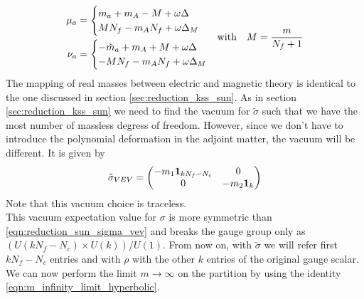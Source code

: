 \begin{equation}
\begin{aligned}
  \mu_a &  = \begin{cases}
  m_a + m_A - M + \omega \Delta \\
  M N_f - m_A N_f + \omega \Delta_M\\
  \end{cases}
  \\
 \nu_a & =   \begin{cases}
  - \tilde{m}_a + m_A + M + \omega \Delta \\
  - M N_f - m_A N_f + \omega \Delta_M \\
  \end{cases}
\end{aligned}
\\
\hbox{with} \quad M =  \frac{m}{N_f +1}
\end{equation}
The mapping of real masses between electric and magnetic theory is identical to the one discussed in section \ref{sec:reduction_kss_sun}.
As in section \ref{sec:reduction_kss_sun} we need to find the vacuum for $\tilde{\sigma}$ such that we have the most number of massless degress of freedom.
However, since we don't have to introduce the polynomial deformation in the adjoint matter, the vacuum will be different. It is given by
\begin{equation}
 \tilde{\sigma}_{VEV} =
 \begin{pmatrix}
  - m_1 \bold{ 1}_{ k N_f - N_c} & 0 \\
  0 &  - m_2 \bold{ 1}_{k}
 \end{pmatrix}
\end{equation}
Note that this vacuum choice is traceless.\\
This vacuum expectation value for $\sigma$ is more symmetric than \eqref{eqn:reduction_sun_sigma_vev} and breaks the gauge group only as $\left(U(k N_f - N_c) \times U(k) \right) / U(1)$.
From now on, with $\tilde{\sigma}$ we will refer first $k N_f - N_c$ entries and with $\rho$ with the other $k$ entries of the original gauge scalar.
\\
We can now perform the limit $m \rightarrow \infty$ on the partition by using the identity \eqref{eqn:m_infinity_limit_hyperbolic}.

